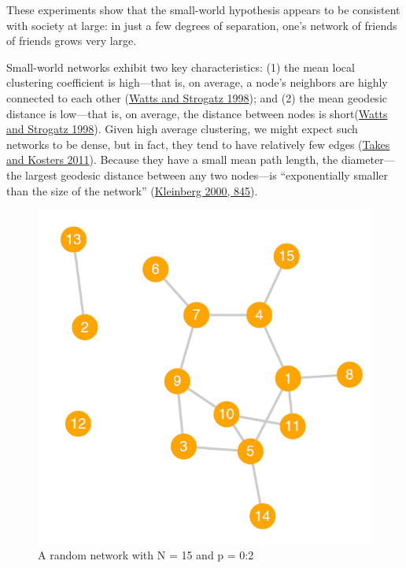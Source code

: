 \documentclass{book}
\begin{document}
These experiments show that the small-world hypothesis appears to be
consistent with society at large: in just a few degrees of separation, one's
network of friends of friends grows very large.

Small-world networks exhibit two key characteristics: (1) the mean local
clustering coefficient is high---that is, on average, a node's neighbors are
highly connected to each other
(\protect\hyperlink{ref-WattsStrogatz1998}{Watts and Strogatz 1998}); and (2)
the mean geodesic distance is low---that is, on average, the distance between
nodes is short(\protect\hyperlink{ref-WattsStrogatz1998}{Watts and Strogatz
1998}). Given high average clustering, we might expect such networks to be
dense, but in fact, they tend to have relatively few edges
(\protect\hyperlink{ref-TakesKosters2011}{Takes and Kosters 2011}). Because
they have a small mean path length, the diameter---the largest geodesic
distance between any two nodes---is ``exponentially smaller than the size of
the network'' (\protect\hyperlink{ref-Kleinberg2000}{Kleinberg 2000, 845}).

\begin{figure}
\hypertarget{fig:fig11-12}{%
\centering
\includegraphics{images/social-networks/11-12.png}
\caption{A random network with N = 15 and p = 0:2}\label{fig:fig11-12}
}
\end{figure}
\end{document}
